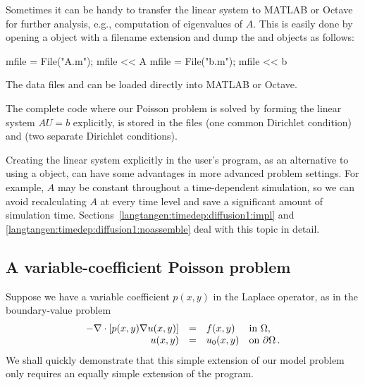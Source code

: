 Sometimes it can be handy to transfer the linear system to MATLAB or
Octave for further analysis, e.g., computation of eigenvalues of $A$.
This is easily done by opening a 
object with a filename extension 
and dump the  and
 objects as
follows:
\begin{python}
mfile = File("A.m"); mfile << A
mfile = File("b.m"); mfile << b
\end{python}
The data files  and  can be loaded directly into
MATLAB or Octave.

The complete code where our Poisson problem is solved by forming the
linear system $AU=b$ explicitly, is stored in the files
 (one common
Dirichlet condition) and
 (two separate
Dirichlet conditions).

Creating the linear system explicitly in the user's program, as an
alternative to using a
 object, can have
some advantages in more advanced problem settings. For example, $A$
may be constant throughout a time-dependent simulation, so we can
avoid recalculating $A$ at every time level and save a significant
amount of simulation time.
Sections~\ref{langtangen:timedep:diffusion1:impl} and
\ref{langtangen:timedep:diffusion1:noassemble} deal with this topic in
detail.


\subsection{A variable-coefficient Poisson problem}
\label{langtangen:possion:2D:varcoeff}

Suppose we have a variable coefficient $p(x,y)$ in the Laplace operator,
as in the boundary-value problem
\begin{equation} \label{langtangen:poisson:2D:varcoeff}
  \begin{array}{rcll}
    - \nabla\cdot \left\lbrack
p(x,y)\nabla u(x,y)\right\rbrack &=& f(x,y) &\mbox{in } \Omega, \\
    u(x,y) &=& u_0(x,y) &\mbox{on } \partial\Omega\thinspace .
  \end{array}
\end{equation}
We shall quickly demonstrate that this simple extension of our model
problem only requires an equally simple extension of the \fenics{} program.

